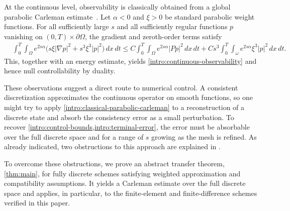 \documentclass[print,wide,eng]{draft}
\begin{document}
At the continuous level, observability is classically obtained from a global parabolic Carleman estimate~\cite{Fursikov1996}. Let $\alpha<0$ and $\xi>0$ be standard parabolic weight functions. For all sufficiently large $s$ and all sufficiently regular functions $p$ vanishing on $(0,T)\times\partial\Omega$, the gradient and zeroth-order terms satisfy
%
\begin{align}\label{intro:classical-parabolic-carleman}
&\int_0^T\!\int_\Omega e^{2s\alpha}
\bigl(s\xi|\nabla p|^2+s^3\xi^3|p|^2\bigr)\,dx\,dt
\leq C\int_0^T\!\int_\Omega e^{2s\alpha}|Pp|^2\,dx\,dt
+Cs^3\int_0^T\!\int_\omega e^{2s\alpha}\xi^3|p|^2\,dx\,dt.
\end{align}
This, together with an energy estimate,  yields \cref{intro:continuous-observability} and hence null controllability by duality.

These observations suggest a direct route to numerical control. A consistent discretization approximates the continuous operator on smooth functions, so one might try to apply \cref{intro:classical-parabolic-carleman} to a reconstruction of a discrete state and absorb the consistency error as a small perturbation. To recover \cref{intro:control-bounds,intro:terminal-error}, the error must be absorbable over the full discrete space and for a range of $s$ growing as the mesh is refined. As already indicated, two obstructions to this approach are explained in .

To overcome these obstructions, we prove an abstract transfer theorem, \cref{thm:main}, for fully discrete schemes satisfying weighted approximation and compatibility assumptions. It yields a Carleman estimate over the full discrete space and applies, in particular, to the finite-element and finite-difference schemes verified in this paper.
\end{document}
